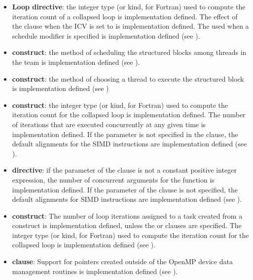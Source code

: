 \begin{itemize}
\item \textbf{Loop directive}: the integer type (or kind, for Fortran) used to compute the iteration 
count of a collapsed loop is implementation defined. The effect of the 
 clause when the  ICV is set to  is 
implementation defined. The  used when a 
schedule modifier is specified is implementation defined (see ).

\item {} \textbf{construct}: the method of scheduling the structured blocks among threads 
in the team is implementation defined (see ).

\item {} \textbf{construct}: the method of choosing a thread to execute the structured block 
is implementation defined (see )

\item {} \textbf{construct}: the integer type (or kind, for
  Fortran) used to compute the iteration count for the collapsed loop
  is implementation defined. The number of iterations that are
  executed concurrently at any given time is implementation
  defined. If the  parameter is not specified in the
   clause, the default alignments for the SIMD
  instructions are implementation defined (see ).

\item {} \textbf{directive}: if the parameter of the
   clause is not a constant positive integer expression,
  the number of concurrent arguments for the function is
  implementation defined. If the  parameter of the
   clause is not specified, the default alignments for
  SIMD instructions are implementation defined (see
  ).

\item {} \textbf{construct}: The number of loop
  iterations assigned to a task created from a 
  construct is implementation defined, unless the  or
   clauses are specified. The integer type (or kind,
  for Fortran) used to compute the iteration count for the collapsed
  loop is implementation defined (see ).

\item {} \textbf{clause}: 
  Support for pointers created outside of the OpenMP device data management
  routines is implementation defined (see ).


\end{itemize}
